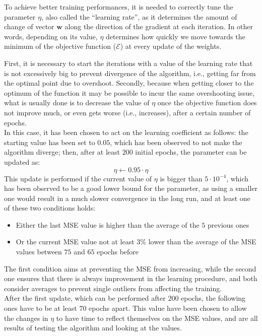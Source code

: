 \documentclass[12pt]{article}
\begin{document}
To achieve better training performances, it is needed to correctly tune the parameter $\eta$, also called the ``learning rate'', as it determines the amount of change of vector $\textbf{w}$ along the direction of the gradient at each iteration.
In other words, depending on its value, $\eta$ determines how quickly we move towards the minimum of the objective function ($\mathcal{E}$) at every update of the weights.

First, it is necessary to start the iterations with a value of the learning rate that is not excessively big to prevent divergence of the algorithm, i.e., getting far from the optimal point due to overshoot.
Secondly, because when getting closer to the optimum of the function it may be possible to incur the same overshooting issue, what is usually done is to decrease the value of $\eta$ once the objective function does not improve much, or even gets worse (i.e., increases), after a certain number of epochs.\\
In this case, it has been chosen to act on the learning coefficient as follows: the starting value has been set to $0.05$, which has been observed to not make the algorithm diverge; then, after at least $200$ initial epochs, the parameter can be updated as:
\begin{equation}
  \eta \leftarrow 0.95\cdot\eta
\end{equation}
This update is performed if the current value of $\eta$ is bigger than $5\cdot 10^{-4}$, which has been observed to be a good lower bound for the parameter, as using a smaller one would result in a much slower convergence in the long run, and at least one of these two conditions holds:
\begin{itemize}
  \item Either the last MSE value is higher than the average of the $5$ previous ones
  \item Or the current MSE value not at least $3\%$ lower than the average of the MSE values between $75$ and $65$ epochs before
\end{itemize}
The first condition aims at preventing the MSE from increasing, while the second one ensures that there is always improvement in the learning procedure, and both consider averages to prevent single outliers from affecting the training.\\
After the first update, which can be performed after $200$ epochs, the following ones have to be at least $70$ epochs apart.
This value have been chosen to allow the changes in $\eta$ to have time to reflect themselves on the MSE values, and are all results of testing the algorithm and looking at the values.
\end{document}
